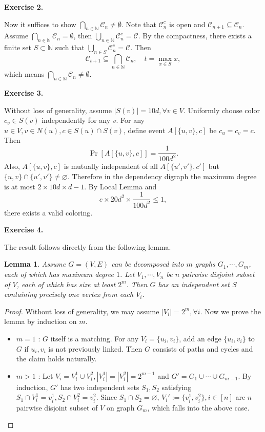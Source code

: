 \documentclass[a4paper]{article}
\newtheorem{lemma}{Lemma}
\newtheorem*{proof}{Proof}
\newenvironment{exercise}[1]{
	\par
	\noindent\textbf{Exercise #1.}\quad
}{
	\par
	\bigskip
}
\newcommand{\sbra}[1]{\left[ #1 \right]}
\newcommand{\Nbb}{\mathbb{N}}
\newcommand{\Ccal}{\mathcal{C}}
\begin{document}
\begin{exercise}{2}
    Now it suffices to show $\bigcap_{n\in\Nbb}\Ccal_n\neq\emptyset$.
    Note that $\Ccal_n^c$ is open and $\Ccal_{n+1}\subseteq\Ccal_n$. Assume $\bigcap_{n\in\Nbb}\Ccal_n=\emptyset$, then 
    $\bigcup_{n\in\Nbb}\Ccal_n^c=\Ccal$. By the compactness, there exists a finite set $S\subset\Nbb$ such that
    $\bigcup_{n\in S}\Ccal_n^c=\Ccal$. Then 
    $$
    \Ccal_{t+1}\subseteq\bigcap_{n\in\Nbb}\Ccal_n,\quad t=\max_{x\in S}x,
    $$
    which means $\bigcap_{n\in\Nbb}\Ccal_n\neq\emptyset$.
\end{exercise}

\begin{exercise}{3}
    Without loss of generality, assume $|S(v)|=10d,\forall v\in V$. Uniformly choose color $c_v\in S(v)$ independently
    for any $v$. For any $u\in V,v\in N(u),c\in S(u)\cap S(v)$, define event $A[\{u,v\},c]$ be $c_u=c_v=c$. Then
    $$
    \Pr\sbra{A[\{u,v\},c]}=\frac1{100d^2}.
    $$
    Also, $A[\{u,v\},c]$ is mutually independent of all $A[\{u',v'\},c']$ but $\{u,v\}\cap\{u',v'\}\neq\varnothing$. 
    Therefore in the dependency digraph the maximum degree is at most $2\times10d\times d-1$.
    By Local Lemma and 
    $$
    e\times20d^2\times\frac1{100d^2}\leq1,
    $$
    there exists a valid coloring.
\end{exercise}

\begin{exercise}{4}
    The result follows directly from the following lemma.
    \begin{lemma}
        Assume $G=(V,E)$ can be decomposed into $m$ graphs $G_1,\cdots,G_m$, each of which has maximum degree $1$.
        Let $V_1,\cdots,V_n$ be $n$ pairwise disjoint subset of $V$, each of which has size at least $2^m$.
        Then $G$ has an independent set $S$ containing precisely one vertex from each $V_i$.
    \end{lemma}
    \begin{proof}
        Without loss of generality, we may assume $|V_i|=2^m,\forall i$.
        Now we prove the lemma by induction on $m$.
        \begin{itemize}
            \item $m=1$ : $G$ itself is a matching. For any $V_i=\{u_i,v_i\}$, add an edge $\{u_i,v_i\}$ to $G$ if $u_i,v_i$
                is not previously linked. Then $G$ consists of paths and cycles and the claim holds naturally.
            \item $m>1$ : Let $V_i=V_i^1\cup V_i^2,|V_i^1|=|V_i^2|=2^{m-1}$ and $G'=G_1\cup\cdots\cup G_{m-1}$.
                By induction, $G'$ has two independent sets $S_1,S_2$ satisfying $S_1\cap V_i^1=v_i^1,S_2\cap V_i^2=v_i^2$.
                Since $S_1\cap S_2=\varnothing$, $V_i':=\{v_i^1,v_i^2\},i\in[n]$ are $n$ pairwise disjoint subset of $V$ on
                graph $G_m$, which falls into the above case.
        \end{itemize}
    \end{proof}
\end{exercise}
\end{document}
